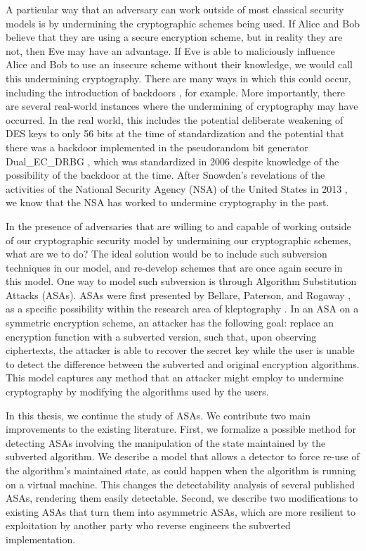 A particular way that an adversary can work outside of most classical security models is by undermining the cryptographic schemes being used. If Alice and Bob believe that they are using a secure encryption scheme, but in reality they are not, then Eve may have an advantage. If Eve is able to maliciously influence Alice and Bob to use an insecure scheme without their knowledge, we would call this undermining cryptography. There are many ways in which this could occur, including the introduction of backdoors \cite{FSE:RijPre97,FSE:Paterson99}, for example. More importantly, there are several real-world instances where the undermining of cryptography may have occurred. In the real world, this includes the potential deliberate weakening of DES keys to only 56 bits at the time of standardization \cite{SB1988} and the potential that there was a backdoor implemented in the pseudorandom bit generator Dual\_EC\_DRBG \cite{USENIX:CNEGLRBMSF14}, which was standardized in 2006 despite knowledge of the possibility of the backdoor at the time. After Snowden's revelations of the activities of the National Security Agency (NSA) of the United States in 2013 \cite{snowden}, we know that the NSA has worked to undermine cryptography in the past.

In the presence of adversaries that are willing to and capable of working outside of our cryptographic security model by undermining our cryptographic schemes, what are we to do? The ideal solution would be to include such subversion techniques in our model, and re-develop schemes that are once again secure in this model. One way to model such subversion is through Algorithm Substitution Attacks (ASAs). ASAs were first presented by Bellare, Paterson, and Rogaway \cite{C:BelPatRog14}, as a specific possibility within the research area of kleptography \cite{C:YouYun96,EC:YouYun97,FSE:YouYun98,SAC:YouYun04,ACISP:YouYun03}. In an ASA on a symmetric encryption scheme, an attacker has the following goal: replace an encryption function with a subverted version, such that, upon observing ciphertexts, the attacker is able to recover the secret key while the user is unable to detect the difference between the subverted and original encryption algorithms. This model captures any method that an attacker might employ to undermine cryptography by modifying the algorithms used by the users.

In this thesis, we continue the study of ASAs. We contribute two main improvements to the existing literature. First, we formalize a possible method for detecting ASAs involving the manipulation of the state maintained by the subverted algorithm. We describe a model that allows a detector to force re-use of the algorithm's maintained state, as could happen when the algorithm is running on a virtual machine. This changes the detectability analysis of several published ASAs, rendering them easily detectable. Second, we describe two modifications to existing ASAs that turn them into asymmetric ASAs, which are more resilient to exploitation by another party who reverse engineers the subverted implementation.

